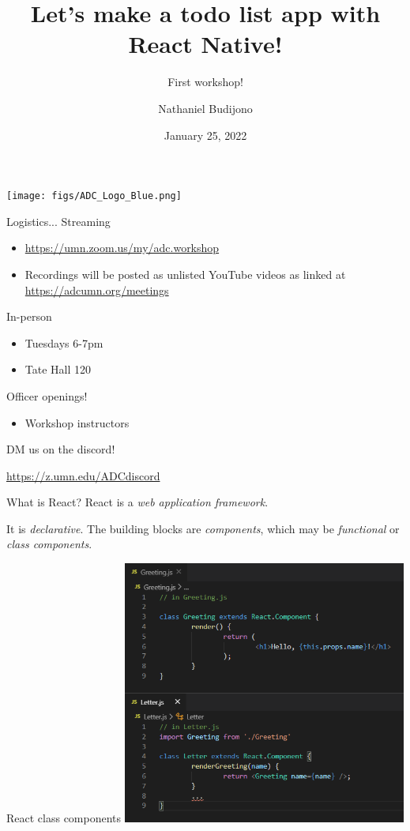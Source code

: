 \documentclass{beamer}
\title{Let's make a todo list app with React Native!}
\subtitle{First workshop!}
\author{Nathaniel Budijono}
\date{January 25, 2022}
\institute{UMN ADC}
\begin{document}
\begin{frame}
    \titlepage
    \texttt{[image: figs/ADC\_Logo\_Blue.png]}
\end{frame}

\begin{frame}{Logistics...}
	Streaming
	\begin{itemize}
		\item \href{https://umn.zoom.us/my/adc.workshop}{https://umn.zoom.us/my/adc.workshop}
		\item Recordings will be posted as unlisted YouTube videos as linked at \href{https://adcumn.org/meetings}{https://adcumn.org/meetings}
	\end{itemize}

	\bigskip\pause

	In-person
	\begin{itemize}
		\item Tuesdays 6-7pm
		\item Tate Hall 120
	\end{itemize}
\end{frame}

\begin{frame}{Officer openings!}
	\begin{itemize}
		\item Workshop instructors
	\end{itemize}

	\bigskip

	DM us on the discord!

	\bigskip

	\href{https://z.umn.edu/ADCdiscord}{https://z.umn.edu/ADCdiscord}
\end{frame}

\begin{frame}{What is React?}
	React is a \emph{web application framework}. 

	\bigskip\pause
	
	It is \emph{declarative}. The building blocks are \emph{components}, which may be \emph{functional} or \emph{class components}.
\end{frame}

\begin{frame}{React class components}
	\centering
	\includegraphics[width=0.7\textwidth]{figs/class-components.png}
\end{frame}
\end{document}
